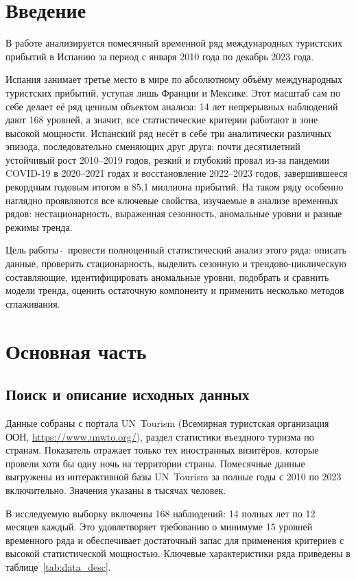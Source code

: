 \documentclass[a4paper,14pt]{extarticle}
\newcommand{\dash}{\,-~}
\begin{document}
\tableofcontents
\newpage
\section*{Введение}
В работе анализируется помесячный временной ряд международных
туристских прибытий в Испанию за период с января 2010 года по декабрь
2023 года.

Испания занимает третье место в мире по абсолютному объёму
международных туристских прибытий, уступая лишь Франции и Мексике.
Этот масштаб сам по себе делает её ряд ценным объектом анализа:
14 лет непрерывных наблюдений дают 168 уровней, а значит, все
статистические критерии работают в зоне высокой мощности. Испанский
ряд несёт в себе три аналитически различных эпизода, последовательно
сменяющих друг друга: почти десятилетний устойчивый рост 2010–2019
годов, резкий и глубокий провал из-за пандемии COVID-19 в 2020–2021
годах и восстановление 2022–2023 годов, завершившееся рекордным
годовым итогом в 85,1 миллиона прибытий. На таком ряду особенно
наглядно проявляются все ключевые свойства, изучаемые в анализе
временных рядов: нестационарность, выраженная сезонность,
аномальные уровни и разные режимы тренда.

Цель работы\dash провести полноценный статистический анализ этого ряда:
описать данные, проверить стационарность, выделить сезонную и
трендово-циклическую составляющие, идентифицировать аномальные уровни,
подобрать и сравнить модели тренда, оценить остаточную компоненту
и применить несколько методов сглаживания.

\section{Основная часть}
\subsection{Поиск и описание исходных данных}
Данные собраны с портала UN~Tourism (Всемирная туристская организация
ООН, \url{https://www.unwto.org/}), раздел статистики въездного туризма
по странам. Показатель отражает только тех иностранных визитёров,
которые провели хотя бы одну ночь на территории страны. Помесячные
данные выгружены из интерактивной базы UN~Tourism за полные годы
с 2010 по 2023 включительно. Значения указаны в тысячах человек.

В исследуемую выборку включены 168 наблюдений: 14 полных лет по
12 месяцев каждый. Это удовлетворяет требованию о минимуме 15 уровней
временного ряда и обеспечивает достаточный запас для применения
критериев с высокой статистической мощностью. Ключевые характеристики
ряда приведены в таблице~\ref{tab:data_desc}.
\end{document}
